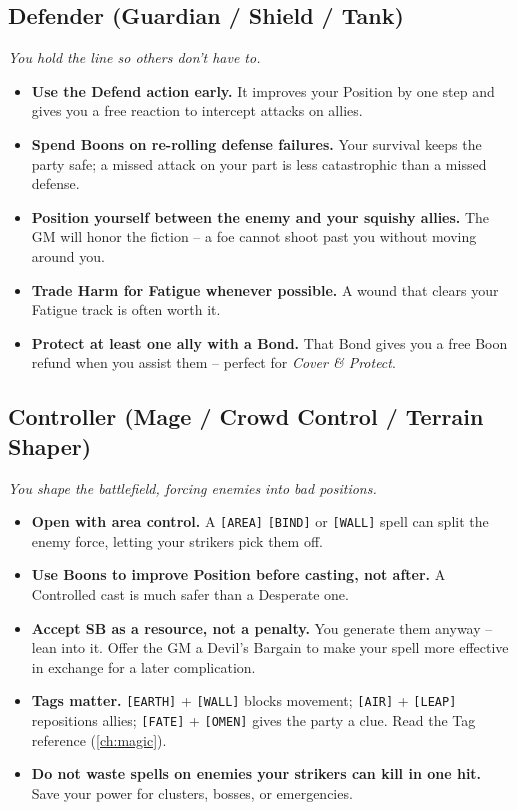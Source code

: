 \subsection{Defender (Guardian / Shield / Tank)}
\textit{You hold the line so others don't have to.}
\begin{itemize}
  \item \textbf{Use the Defend action early.} It improves your Position by one step and gives you a free reaction to intercept attacks on allies.
  \item \textbf{Spend Boons on re-rolling defense failures.} Your survival keeps the party safe; a missed attack on your part is less catastrophic than a missed defense.
  \item \textbf{Position yourself between the enemy and your squishy allies.} The GM will honor the fiction -- a foe cannot shoot past you without moving around you.
  \item \textbf{Trade Harm for Fatigue whenever possible.} A wound that clears your Fatigue track is often worth it.
  \item \textbf{Protect at least one ally with a Bond.} That Bond gives you a free Boon refund when you assist them -- perfect for \emph{Cover \& Protect}.
\end{itemize}

\subsection{Controller (Mage / Crowd Control / Terrain Shaper)}
\textit{You shape the battlefield, forcing enemies into bad positions.}
\begin{itemize}
  \item \textbf{Open with area control.} A \texttt{[AREA]} \texttt{[BIND]} or \texttt{[WALL]} spell can split the enemy force, letting your strikers pick them off.
  \item \textbf{Use Boons to improve Position before casting, not after.} A Controlled cast is much safer than a Desperate one.
  \item \textbf{Accept SB as a resource, not a penalty.} You generate them anyway -- lean into it. Offer the GM a Devil's Bargain to make your spell more effective in exchange for a later complication.
  \item \textbf{Tags matter.} \texttt{[EARTH]} + \texttt{[WALL]} blocks movement; \texttt{[AIR]} + \texttt{[LEAP]} repositions allies; \texttt{[FATE]} + \texttt{[OMEN]} gives the party a clue. Read the Tag reference (\ref{ch:magic}).
  \item \textbf{Do not waste spells on enemies your strikers can kill in one hit.} Save your power for clusters, bosses, or emergencies.
\end{itemize}

